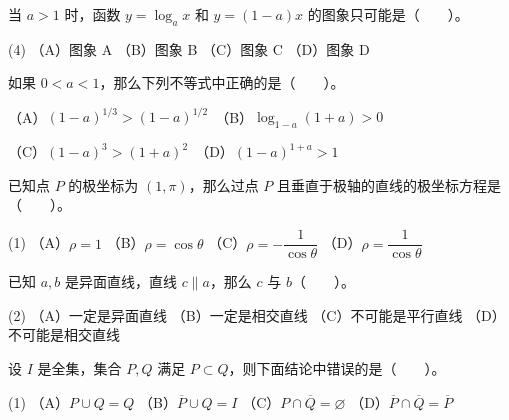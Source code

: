 \Needspace{0.4\textheight}
\begin{question}
当 \(a>1\) 时，函数 \(y=\log_a x\) 和 \(y=(1-a)x\) 的图象只可能是\mbox{（　　）}。

\begin{gkopts}(4)
\task （A）图象 A
\task （B）图象 B
\task （C）图象 C
\task （D）图象 D
\end{gkopts}
\nopagebreak[4]
\begin{center}\end{center}
\nopagebreak[4]
\end{question}
\begin{question}
如果 \(0<a<1\)，那么下列不等式中正确的是\mbox{（　　）}。

（A）\((1-a)^{1/3}>(1-a)^{1/2}\)　（B）\(\log_{1-a}(1+a)>0\)

（C）\((1-a)^3>(1+a)^2\)　（D）\((1-a)^{1+a}>1\)

\end{question}
\begin{question}
已知点 \(P\) 的极坐标为 \((1,\pi)\)，那么过点 \(P\) 且垂直于极轴的直线的极坐标方程是\mbox{（　　）}。

\begin{gkopts}(1)
\task （A）\(\rho=1\)
\task （B）\(\rho=\cos\theta\)
\task （C）\(\rho=-\dfrac1{\cos\theta}\)
\task （D）\(\rho=\dfrac1{\cos\theta}\)
\end{gkopts}

\end{question}
\begin{question}
已知 \(a,b\) 是异面直线，直线 \(c\parallel a\)，那么 \(c\) 与 \(b\)\mbox{（　　）}。

\begin{gkopts}(2)
\task （A）一定是异面直线
\task （B）一定是相交直线
\task （C）不可能是平行直线
\task （D）不可能是相交直线
\end{gkopts}

\end{question}
\begin{question}
设 \(I\) 是全集，集合 \(P,Q\) 满足 \(P\subset Q\)，则下面结论中错误的是\mbox{（　　）}。

\begin{gkopts}(1)
\task （A）\(P\cup Q=Q\)
\task （B）\(\overline P\cup Q=I\)
\task （C）\(P\cap\overline Q=\varnothing\)
\task （D）\(\overline P\cap\overline Q=\overline P\)
\end{gkopts}

\end{question}
